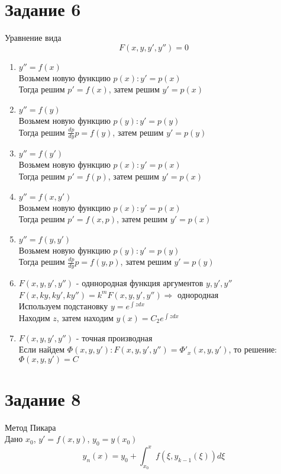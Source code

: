 \documentclass{article}
\begin{document}
\section{Задание 6}
\label{sec:orge503b69}
Уравнение вида
\[ F(x, y, y', y'') = 0 \]

\begin{enumerate}
\item \(y'' = f(x)\) \\
Возьмем новую функцию \(p(x): y' = p(x)\) \\
Тогда решим \(p' = f(x)\), затем решим \(y' = p(x)\)
\item \(y'' = f(y)\) \\
Возьмем новую функцию \(p(y): y' = p(y)\) \\
Тогда решим \(\frac{dp}{dy}p = f(y)\), затем решим \(y' = p(y)\)
\item \(y'' = f(y')\) \\
Возьмем новую функцию \(p(x): y' = p(x)\) \\
Тогда решим \(p' = f(p)\), затем решим \(y' = p(x)\)
\item \(y'' = f(x, y')\) \\
Возьмем новую функцию \(p(x): y' = p(x)\) \\
Тогда решим \(p' = f(x, p)\), затем решим \(y' = p(x)\)
\item \(y'' = f(y, y')\) \\
Возьмем новую функцию \(p(y): y' = p(y)\) \\
Тогда решим \(\frac{dp}{dy}p = f(y, p)\), затем решим \(y' = p(y)\)
\item \(F(x, y, y', y'')\) - одннородная функция аргументов \(y, y', y''\) \\
\(F(x, ky, ky', ky'') = k^mF(x, y, y', y'') \Rightarrow\) однородная \\
Используем подстановку \(y = e^{\int z dx}\) \\
Находим \(z\), затем находим \(y(x) = C_2e^{\int z dx}\)
\item \(F(x, y, y', y'')\) - точная производная \\
Если найдем \(\Phi(x, y, y'): F(x, y, y', y'') = \Phi'_x(x, y, y')\),
то решение: \(\Phi(x, y, y') = C\)
\end{enumerate}

\section{Задание 8}
\label{sec:org8a81292}
Метод Пикара \\
Дано \(x_0\), \(y' = f(x, y)\), \(y_0 = y(x_0)\) \\
\[ y_n(x) = y_0 + \int_{x_0}^xf(\xi, y_{k-1}(\xi))d\xi \]
\end{document}
